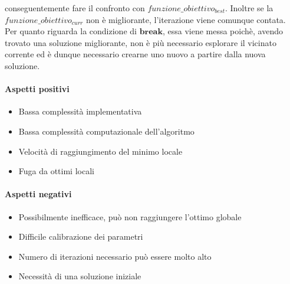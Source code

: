 conseguentemente fare il confronto con {$funzione\_obiettivo_{best}$}. Inoltre se la {$funzione\_obiettivo_{curr}$} non è migliorante, l'iterazione
viene comunque contata.\\
Per quanto riguarda la condizione di {$\textbf{break}$}, essa viene messa poichè, avendo trovato una soluzione migliorante, non è più necessario
esplorare il vicinato corrente ed è dunque necessario crearne uno nuovo a partire dalla nuova soluzione.\\
\vspace*{\fill}
\newpage
\noindent \paragraph{Aspetti positivi}
\begin{itemize}
    \item Bassa complessità implementativa
    \item Bassa complessità computazionale dell'algoritmo
    \item Velocità di raggiungimento del minimo locale
    \item Fuga da ottimi locali
\end{itemize}

\noindent \paragraph{Aspetti negativi}
\begin{itemize}
    \item Possibilmente inefficace, può non raggiungere l'ottimo globale
    \item Difficile calibrazione dei parametri
    \item Numero di iterazioni necessario può essere molto alto
    \item Necessità di una soluzione iniziale
\end{itemize}
